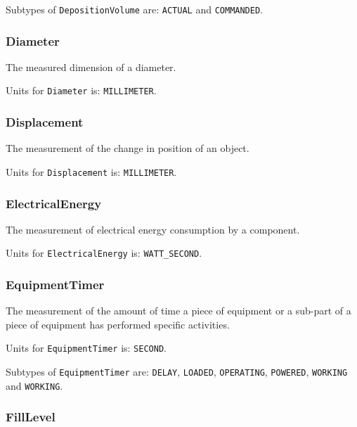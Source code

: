 Subtypes of \texttt{DepositionVolume} are: \texttt{ACTUAL} and \texttt{COMMANDED}. 
\FloatBarrier

\subsubsection{Diameter}
  \label{sec:Diameter}



The measured dimension of a diameter.


Units for \texttt{Diameter} is: \texttt{MILLIMETER}.

\FloatBarrier

\subsubsection{Displacement}
  \label{sec:Displacement}



The measurement of the change in position of an object.


Units for \texttt{Displacement} is: \texttt{MILLIMETER}.

\FloatBarrier

\subsubsection{ElectricalEnergy}
  \label{sec:ElectricalEnergy}



The measurement of electrical energy consumption by a component.


Units for \texttt{ElectricalEnergy} is: \texttt{WATT_SECOND}.

\FloatBarrier

\subsubsection{EquipmentTimer}
  \label{sec:EquipmentTimer}



The measurement of the amount of time a piece of equipment or a sub-part of a piece of equipment has performed specific activities.


Units for \texttt{EquipmentTimer} is: \texttt{SECOND}.


Subtypes of \texttt{EquipmentTimer} are: \texttt{DELAY}, \texttt{LOADED}, \texttt{OPERATING}, \texttt{POWERED}, \texttt{WORKING} and \texttt{WORKING}. 
\FloatBarrier

\subsubsection{FillLevel}
  \label{sec:FillLevel}



